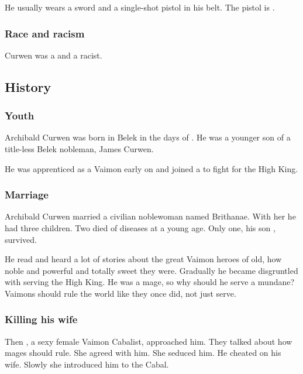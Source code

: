 He usually wears a sword and a single-shot pistol in his belt. 
The pistol is . 





\subsubsection{Race and racism}
Curwen was a \truehuman and a racist.









\subsection{History}





\subsubsection{Youth}
Archibald Curwen was born in Belek in the days of . 
He was a younger son of a title-less Belek nobleman, James Curwen. 

He was apprenticed as a Vaimon early on and joined a \Velcadian{} \ishrah{} to fight for the High King. 






\subsubsection{Marriage}
Archibald Curwen married a civilian noblewoman named Brithanae. 
With her he had three children.
Two died of diseases at a young age. 
Only one, his son , survived. 

He read and heard a lot of stories about the great Vaimon heroes of old, how noble and powerful and totally sweet they were. 
Gradually he became disgruntled with serving the High King. 
He was a mage, so why should he serve a mundane? 
Vaimons should rule the world like they once did, not just serve. 





\subsubsection{Killing his wife}
Then , a sexy female Vaimon Cabalist, approached him. 
They talked about how mages should rule. 
She agreed with him. 
She seduced him. 
He cheated on his wife. 
Slowly she introduced him to the Cabal. 

